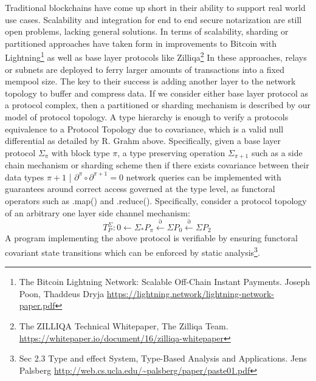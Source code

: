 \documentclass{article}
\begin{document}
Traditional blockchains have come up short in their ability to support real world use cases. Scalability and integration for end to end secure notarization are still open problems, lacking general solutions. In terms of scalability, sharding or partitioned approaches have taken form in improvements to Bitcoin with Lightning\footnote{The Bitcoin Lightning Network:
Scalable Off-Chain Instant Payments. Joseph Poon, Thaddeus Dryja \url{https://lightning.network/lightning-network-paper.pdf}} as well as base layer protocols like Zilliqa\footnote{The ZILLIQA Technical Whitepaper, The Zilliqa Team. \url{https://whitepaper.io/document/16/zilliqa-whitepaper}} In these approaches, relays or subnets are deployed to ferry larger amounts of transactions into a fixed mempool size. The key to their success is adding another layer to the network topology to buffer and compress data. If we consider either base layer protocol as a protocol complex, then a partitioned or sharding mechanism is described by our model of protocol topology. A type hierarchy is enough to verify a protocols equivalence to a Protocol Topology due to covariance, which is a valid null differential as detailed by R. Grahm above. Specifically, given a base layer protocol $\Sigma_\pi$ with block type $\pi$, a type preserving operation $\Sigma_{\pi+1}$ such as a side chain mechanism or sharding scheme then if there exists covariance between their data types $\pi+1$ | $\partial^\pi \circ \partial^{\pi+1} = 0$ network queries can be implemented with guarantees around correct access governed at the type level, as functoral operators such as .map() and .reduce(). Specifically, consider a protocol topology of an arbitrary one layer side channel mechanism:
\begin{equation} \label{eq1}
T^{\Sigma}_P: 0 \leftarrow \Sigma_{*}P_\pi \xleftarrow{\partial} \Sigma P_{0} \xleftarrow{\partial} \Sigma P_2 \ 
\end{equation} \label{eq1}
A program implementing the above protocol is verifiable by ensuring functoral covariant state transitions which can be enforced by static analysis\footnote{Sec 2.3 Type and effect System, Type-Based Analysis and Applications. Jens Palsberg \url{http://web.cs.ucla.edu/~palsberg/paper/paste01.pdf}}.
\end{document}
